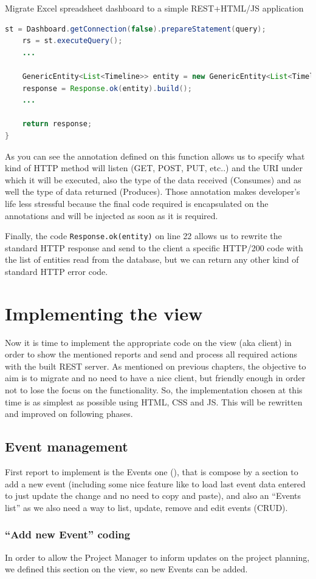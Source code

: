 \begin{part}{Migrate Excel spreadsheet dashboard to a simple REST+HTML/JS
application}
\begin{lstlisting}[language=Java,breaklines=true,caption=Reports.getTimelinesByProjects(),label=f_migration_gettimelines]
	st = Dashboard.getConnection(false).prepareStatement(query);
	rs = st.executeQuery();
	...
	
	GenericEntity<List<Timeline>> entity = new GenericEntity<List<Timeline>>(timelines) {};
	response = Response.ok(entity).build();
	...
	
	return response;
}
\end{lstlisting}

As you can see the annotation defined on this function allows us to specify what
kind of HTTP method will listen (GET, POST, PUT, etc..) and the URI under which
it will be executed, also the type of the data received (Consumes) and as well
the type of data returned (Produces). Those annotation makes developer's
life less stressful because the final code required is encapsulated on the
annotations and will be injected as soon as it is required.

Finally, the code \texttt{Response.ok(entity)} on line 22 allows us to rewrite
the standard HTTP response and send to the client a specific HTTP/200 code with the
list of entities read from the database, but we can return any other kind of
standard HTTP error code.

\section{Implementing the view}
Now it is time to implement the appropriate code on the view (aka client) in
order to show the mentioned reports and send and process all required actions with
the built REST server. As mentioned on previous chapters, the objective to aim
is to migrate and no need to have a nice client, but friendly enough in order
not to lose the focus on the functionality. So, the implementation chosen at this
time is as simplest as possible using HTML, CSS and JS. This will be rewritten
and improved on following phases.

\subsection{Event management}
First report to implement is the Events one (), that
is compose by a section to add a new event (including some nice feature like to
load last event data entered to just update the change and no need to copy and
paste), and also an ``Events list'' as we also need a way to list, update,
remove and edit events (CRUD).

\subsubsection{``Add new Event'' coding}
In order to allow the Project Manager to inform updates on the project planning,
we defined this section on the view, so new Events can be added.


\end{part}
